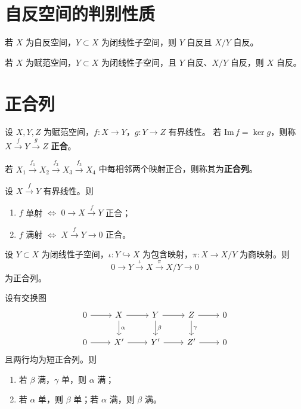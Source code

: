 \documentclass[lang=cn,a4paper,newtx,section]{elegantbook}
\begin{document}
\section{自反空间的判别性质}

\begin{theorem}
  若 $X$ 为自反空间，$Y\subset X$ 为闭线性子空间，则 $Y$ 自反且 $X/Y$ 自反。
\end{theorem}

\begin{theorem}
  若 $X$ 为赋范空间，$Y\subset X$ 为闭线性子空间，且 $Y$ 自反、$X/Y$ 自反，则 $X$ 自反。
\end{theorem}

\section{正合列}

\begin{definition}[正合列]
  设 $X,Y,Z$ 为赋范空间，$f:X\to Y$，$g:Y\to Z$ 有界线性。
  若 $\mathrm{Im}\,f=\ker g$，则称 $X\xrightarrow{f}Y\xrightarrow{g}Z$ \textbf{正合}。

  若 $X_1\xrightarrow{f_1}X_2\xrightarrow{f_2}X_3\xrightarrow{f_3}X_4$ 中每相邻两个映射正合，则称其为\textbf{正合列}。
\end{definition}

\begin{proposition}
  设 $X\xrightarrow{f}Y$ 有界线性。则
  \begin{enumerate}
    \item $f$ 单射 $\Longleftrightarrow$ $0\to X\xrightarrow{f}Y$ 正合；
    \item $f$ 满射 $\Longleftrightarrow$ $X\xrightarrow{f}Y\to 0$ 正合。
  \end{enumerate}
\end{proposition}

\begin{remark}
  设 $Y\subset X$ 为闭线性子空间，$\iota:Y\hookrightarrow X$ 为包含映射，$\pi:X\to X/Y$ 为商映射。则
  \[
    0\to Y\xrightarrow{\iota}X\xrightarrow{\pi}X/Y\to 0
  \]
  为正合列。
\end{remark}

\begin{lemma}[五引理]\label{lem:five-lemma}
  设有交换图
  \[
    \begin{tikzcd}
      0 \arrow[r] & X \arrow[r] \arrow[d,"\alpha"] & Y \arrow[r] \arrow[d,"\beta"] & Z \arrow[r] \arrow[d,"\gamma"] & 0 \\
      0 \arrow[r] & X' \arrow[r] & Y' \arrow[r] & Z' \arrow[r] & 0
    \end{tikzcd}
  \]
  且两行均为短正合列。则
  \begin{enumerate}
    \item 若 $\beta$ 满，$\gamma$ 单，则 $\alpha$ 满；
    \item 若 $\alpha$ 单，则 $\beta$ 单；若 $\alpha$ 满，则 $\beta$ 满。
  \end{enumerate}
\end{lemma}
\end{document}
